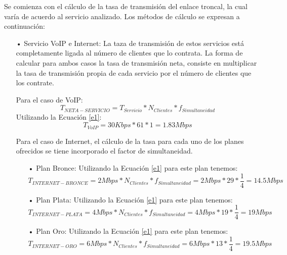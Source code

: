 Se comienza con el cálculo de la tasa de transmisión del enlace troncal, la cual varía de acuerdo al servicio analizado. Los métodos de cálculo se expresan a continuación:

\begin{itemize}

\item[•]Servicio VoIP e Internet: La taza de transmisión de estos servicios está completamente ligada al número de clientes que lo contrata. La forma de calcular para ambos casos la tasa de transmisión neta, consiste en multiplicar la tasa de transmisión propia de cada servicio por el número de clientes que los contrate. 

Para el caso de VoIP:
\begin{equation}
T_{NETA-SERVICIO}=T_{Servicio} * N_{Clientes} * f_{Simultaneidad}
\label{e1}
\end{equation}
Utilizando la Ecuación \ref{e1}:
\begin{equation}
T_{VoIP}=30Kbps * 61 * 1=1.83 Mbps 
\end{equation}

Para el caso de Internet, el cálculo de la tasa para cada uno de los planes ofrecidos se tiene incorporado el factor de simultaneidad.

\begin{itemize}
\item[•]Plan Bronce:
Utilizando la Ecuación \ref{e1} para este plan tenemos:
\begin{equation}
T_{INTERNET-BRONCE}= 2Mbps * N_{Clientes} * f_{Simultaneidad}=2Mbps * 29 * \frac{1}{4}=14.5Mbps
\end{equation}

\item[•]Plan Plata:
Utilizando la Ecuación \ref{e1} para este plan tenemos:
\begin{equation}
T_{INTERNET-PLATA}= 4Mbps * N_{Clientes} * f_{Simultaneidad}=4Mbps * 19 * \frac{1}{4}=19Mbps
\end{equation}

\item[•]Plan Oro:
Utilizando la Ecuación \ref{e1} para este plan tenemos:
\begin{equation}
T_{INTERNET-ORO}= 6Mbps * N_{Clientes} * f_{Simultaneidad}=6Mbps * 13 * \frac{1}{4}=19.5Mbps
\end{equation}
\end{itemize}


\end{itemize}
